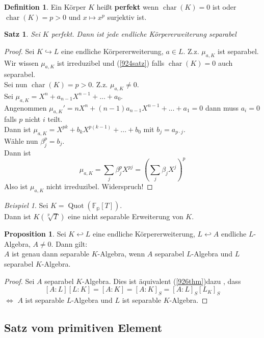 \documentclass[10pt,a4paper]{article}
\newcommand{\Quot}{\operatorname{Quot}}
\newcommand{\cha}{\ensuremath{\operatorname{char}}}
\newcounter{thm}[section]
\theoremstyle{definition}
\newtheorem{definition}[thm]{Definition}
\newtheorem{prop}[thm]{Proposition}
\theoremstyle{plain}
\newtheorem{satz}[thm]{Satz}
\theoremstyle{remark}
\newtheorem{exm}[thm]{Beispiel}
\begin{document}
\begin{definition}
	Ein Körper $K$ heißt \textbf{perfekt} wenn $\cha(K)=0$ ist oder $\cha(K)=p>0$ und $x\mapsto x^p$ surjektiv ist.
\end{definition}
\addtocounter{thm}{-1}

\begin{satz}\label{927satz}
	Sei $K$ perfekt. Dann ist jede endliche Körpererweiterung separabel
\end{satz}
\begin{proof}
	Sei $K\hookrightarrow L$ eine endliche Körpererweiterung, $a\in L$. Z.z. $\mu_{a,K}$ ist separabel.\\
	Wir wissen $\mu_{a,K}$ ist irreduzibel und (\ref{924satz}) falls $\cha(K)=0$ auch separabel.\\
	Sei nun $\cha(K)=p>0$. Z.z. $\mu_{a,K}\neq 0$.\\
	Sei $\mu_{a,K}=X^n+a_{n-1}X^{n-1}+...+a_0$. \\
	Angenommen $\mu_{a,K}'=nX^n+(n-1)a_{n-1}X^{n-1}+...+a_1=0$ dann muss $a_i=0$ falls $p$ nicht $i$ teilt.\\
	Dann ist $\mu_{a,K}=X^{pk}+b_kX^{p(k-1)}+...+b_0$ mit $b_j=a_{p\cdot j}$.\\
	Wähle nun $\beta_j^p=b_j$. \\
	Dann ist 
	\[\mu_{a,K}=\sum_j\beta_j^pX^{pj}=\left(\sum_j\beta_jX^j\right)^p\]
	Also ist $\mu_{a,K}$ nicht irreduzibel. Widerspruch!
\end{proof}

\begin{exm}
	Sei $K=\Quot(\mathbb{F_p}[T])$.\\
	Dann ist $K(\sqrt[p]{T})$ eine nicht separable Erweiterung von $K$.
\end{exm}

\begin{prop}\label{929prop}
	Sei $K\hookleftarrow L$ eine endliche Körpererweiterung, $L\hookleftarrow A$ endliche $L$-Algebra, $A\neq 0$. Dann gilt:\\
	$A$ ist genau dann separable $K$-Algebra, wenn $A$ separabel $L$-Algebra und $L$ separabel $K$-Algebra.
\end{prop}
\begin{proof}
	Sei $A$ separabel $K$-Algebra. Dies ist äquivalent (\ref{926thm})dazu , dass 
	\[[A:L][L:K]=[A:K]=[A:K]_S=[A:L]_S[L_K]_S\]
	$\Leftrightarrow$ $A$ ist separable $L$-Algebra und $L$ ist separable $K$-Algebra.
\end{proof}


\subsection{Satz vom primitiven Element}
\end{document}
